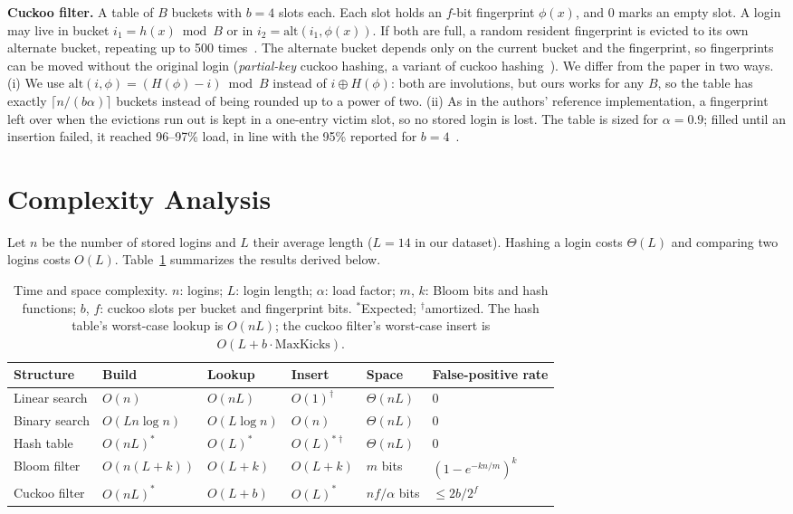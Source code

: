 \documentclass[acmsmall,nonacm]{acmart}
\begin{document}
\textbf{Cuckoo filter.} A table of $B$ buckets with $b = 4$ slots each. Each
slot holds an $f$-bit fingerprint $\phi(x)$, and 0 marks an empty slot. A login
may live in bucket $i_1 = h(x) \bmod B$ or in $i_2 = \mathrm{alt}(i_1, \phi(x))$.
If both are full, a random resident fingerprint is evicted to its own alternate
bucket, repeating up to 500 times~\cite{fan2014}. The alternate bucket depends
only on the current bucket and the fingerprint, so fingerprints can be moved
without the original login (\emph{partial-key} cuckoo hashing, a variant of
cuckoo hashing~\cite{pagh2004}). We differ from the paper in two ways. (i) We
use $\mathrm{alt}(i, \phi) = (H(\phi) - i) \bmod B$ instead of
$i \oplus H(\phi)$: both are involutions, but ours works for any $B$, so the
table has exactly $\lceil n/(b\alpha) \rceil$ buckets instead of being rounded up
to a power of two. (ii) As in the authors' reference implementation, a
fingerprint left over when the evictions run out is kept in a one-entry victim
slot, so no stored login is lost. The table is sized for $\alpha = 0.9$; filled
until an insertion failed, it reached 96--97\% load, in line with the 95\%
reported for $b = 4$~\cite{fan2014}.

\section{Complexity Analysis}
\label{sec:complexity}

Let $n$ be the number of stored logins and $L$ their average length ($L = 14$
in our dataset). Hashing a login costs $\Theta(L)$ and comparing two logins
costs $O(L)$. Table~\ref{tab:complexity} summarizes the results derived below.

\begin{table}[t]
\caption{Time and space complexity. $n$: logins; $L$: login length; $\alpha$: load factor; $m$, $k$: Bloom bits and hash functions; $b$, $f$: cuckoo slots per bucket and fingerprint bits. $^{*}$Expected; $^{\dagger}$amortized. The hash table's worst-case lookup is $O(nL)$; the cuckoo filter's worst-case insert is $O(L + b \cdot \mathrm{MaxKicks})$.}
\label{tab:complexity}
\small
\setlength{\tabcolsep}{5pt}
\begin{tabular}{@{}llllll@{}}
\toprule
Structure & Build & Lookup & Insert & Space & False-positive rate \\
\midrule
Linear search & $O(n)$ & $O(nL)$ & $O(1)^{\dagger}$ & $\Theta(nL)$ & 0 \\
Binary search & $O(Ln\log n)$ & $O(L\log n)$ & $O(n)$ & $\Theta(nL)$ & 0 \\
Hash table & $O(nL)^{*}$ & $O(L)^{*}$ & $O(L)^{*\dagger}$ & $\Theta(nL)$ & 0 \\
Bloom filter & $O(n(L+k))$ & $O(L+k)$ & $O(L+k)$ & $m$ bits & $(1-e^{-kn/m})^k$ \\
Cuckoo filter & $O(nL)^{*}$ & $O(L+b)$ & $O(L)^{*}$ & $nf/\alpha$ bits & $\le 2b/2^f$ \\
\bottomrule
\end{tabular}
\end{table}
\end{document}
